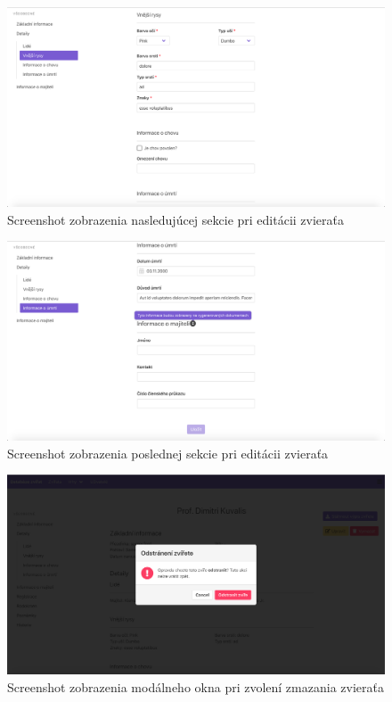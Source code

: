 \begin{figure}[H]
	\includegraphics[width=1.0\textwidth]{media/priloha/zviera/editacia/6.png}
	\caption{Screenshot zobrazenia nasledujúcej sekcie pri editácii zvieraťa}
\end{figure}

\begin{figure}[H]
	\includegraphics[width=1.0\textwidth]{media/priloha/zviera/editacia/7.png}
	\caption{Screenshot zobrazenia poslednej sekcie pri editácii zvieraťa}
\end{figure}

\begin{figure}[H]
	\includegraphics[width=1.0\textwidth]{media/priloha/zviera/editacia/8.png}
	\caption{Screenshot zobrazenia modálneho okna pri zvolení zmazania zvieraťa}
\end{figure}


